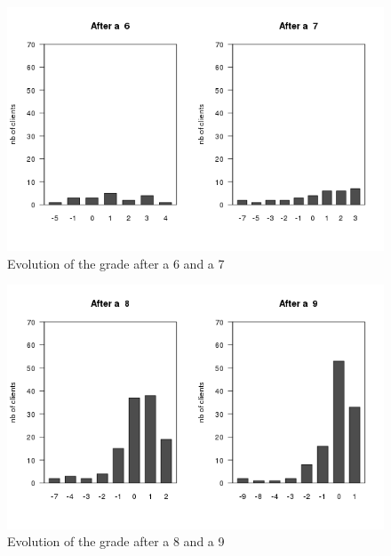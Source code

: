\documentclass[a4paper, 11pt]{article}
\begin{document}
    \begin{figure}[!ht]
            \centering
            \includegraphics[height = 10 cm]{Remi/Evolution_of_the_grade_after_a_7.png}
            \caption{Evolution of the grade after a 6 and a 7}
            \label{fig:e_7}
    \end{figure}

    \begin{figure}[!ht]
            \centering
            \includegraphics[height = 10 cm]{Remi/Evolution_of_the_grade_after_a_9.png}
            \caption{Evolution of the grade after a 8 and a 9}
            \label{fig:e_9}
    \end{figure}
\end{document}
